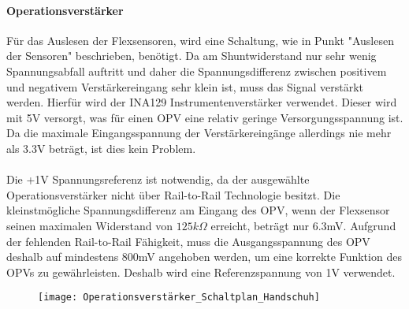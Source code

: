 \documentclass[titlepage,12pt,twoside]{article}
\begin{document}
\paragraph{Operationsverstärker}
\hfill \break
\hfill \break
Für das Auslesen der Flexsensoren, wird eine Schaltung, wie in Punkt "Auslesen der Sensoren" beschrieben, benötigt. Da am
Shuntwiderstand nur sehr wenig Spannungsabfall auftritt und daher die Spannungsdifferenz zwischen positivem und negativem 
Verstärkereingang sehr klein ist, muss das Signal verstärkt werden. Hierfür wird der INA129 Instrumentenverstärker verwendet.
Dieser wird mit 5V versorgt, was für einen OPV eine relativ geringe Versorgungsspannung ist. Da die maximale Eingangsspannung
der Verstärkereingänge allerdings nie mehr als 3.3V beträgt, ist dies kein Problem. \\
\\
Die +1V Spannungsreferenz ist notwendig, da der ausgewählte Operationsverstärker nicht über Rail-to-Rail Technologie besitzt. 
Die kleinstmögliche Spannungsdifferenz am Eingang des OPV, wenn der Flexsensor seinen maximalen Widerstand von
$125k\Omega$ erreicht, beträgt nur 6.3mV. Aufgrund der fehlenden Rail-to-Rail Fähigkeit, muss die Ausgangsspannung des OPV deshalb
auf mindestens 800mV angehoben werden, um eine korrekte Funktion des OPVs zu gewährleisten. Deshalb wird eine Referenzspannung
von 1V verwendet. \\
\begin{figure}[H]
	\begin{center}
		\scalebox{0.5}
		{\texttt{[image: Operationsverstärker\_Schaltplan\_Handschuh]}}
	\end{center}
\end{figure}
\end{document}
